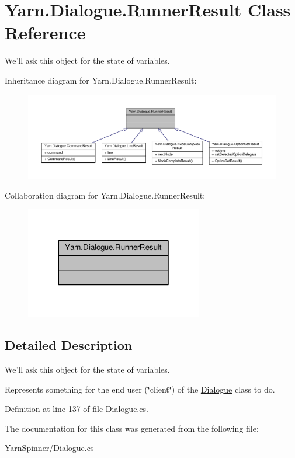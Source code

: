 \hypertarget{a00141}{\section{Yarn.\-Dialogue.\-Runner\-Result Class Reference}
\label{a00141}
}


We'll ask this object for the state of variables.  




Inheritance diagram for Yarn.\-Dialogue.\-Runner\-Result\-:
\nopagebreak
\begin{figure}[H]
\begin{center}
\leavevmode
\includegraphics[width=350pt]{a00600}
\end{center}
\end{figure}


Collaboration diagram for Yarn.\-Dialogue.\-Runner\-Result\-:
\nopagebreak
\begin{figure}[H]
\begin{center}
\leavevmode
\includegraphics[width=220pt]{a00601}
\end{center}
\end{figure}


\subsection{Detailed Description}
We'll ask this object for the state of variables. 

Represents something for the end user (\char`\"{}client\char`\"{}) of the \hyperlink{a00088}{Dialogue} class to do. 

Definition at line 137 of file Dialogue.\-cs.



The documentation for this class was generated from the following file\-:\begin{DoxyCompactItemize}
\item 
Yarn\-Spinner/\hyperlink{a00282}{Dialogue.\-cs}\end{DoxyCompactItemize}
